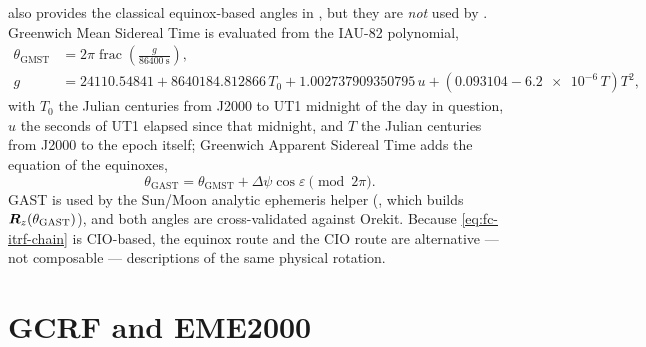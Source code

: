 \lupnt{} also provides the classical equinox-based angles in
, but they are \emph{not}
used by . Greenwich Mean Sidereal Time is evaluated from the
IAU-82 polynomial,
%
\begin{equation}
  \label{eq:fc-gmst}
  \begin{aligned}
    \theta_{\mathrm{GMST}}
      &= 2\pi \operatorname{frac}\!\left(\frac{g}{\SI{86400}{\second}}\right), \\
    g &= 24110.54841 + 8640184.812866\,T_0
         + 1.002737909350795\,u
         + \left(0.093104 - \num{6.2e-6}\,T\right)T^2,
  \end{aligned}
\end{equation}
%
with $T_0$ the Julian centuries from J2000 to UT1 midnight of the day in
question, $u$ the seconds of UT1 elapsed since that midnight, and $T$ the
Julian centuries from J2000 to the epoch itself; Greenwich Apparent Sidereal
Time adds the equation of the equinoxes,
%
\begin{equation}
  \label{eq:fc-gast}
  \theta_{\mathrm{GAST}} = \theta_{\mathrm{GMST}} + \Delta\psi\cos\varepsilon
  \pmod{2\pi}.
\end{equation}
%
GAST is used by the Sun/Moon analytic ephemeris helper
(, which builds
$\bm{R}_z(\theta_{\mathrm{GAST}})$), and both angles are cross-validated
against Orekit. Because \cref{eq:fc-itrf-chain} is CIO-based, the equinox
route and the CIO route are alternative --- not composable --- descriptions
of the same physical rotation.

\section{GCRF and EME2000}
\label{sec:fc-eme}

